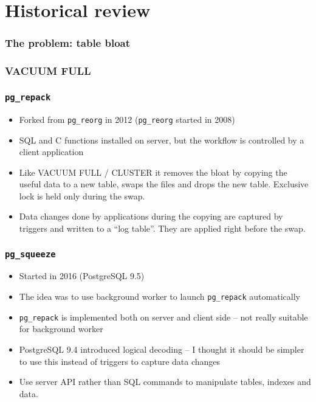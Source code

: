 \section{Historical review}

\begin{frame}
	\frametitle{The problem: table bloat}
\end{frame}

\begin{frame}
	\frametitle{VACUUM FULL}
\end{frame}

\begin{frame}
	\frametitle{\texttt{pg\_repack}}
  \begin{itemize}
    \item Forked from \texttt{pg\_reorg} in 2012 (\texttt{pg\_reorg} started
      in 2008)
    \item SQL and C functions installed on server, but the workflow is
      controlled by a client application
    \item Like VACUUM FULL / CLUSTER it removes the bloat by copying the
      useful data to a new table, swaps the files and drops the new
      table. Exclusive lock is held only during the swap.
    \item Data changes done by applications during the copying are captured by
      triggers and written to a ``log table''. They are applied right before
      the swap.
  \end{itemize}
\end{frame}

\begin{frame}
        \frametitle{\texttt{pg\_squeeze}}
  \begin{itemize}
    \item Started in 2016 (PostgreSQL 9.5)
    \item The idea was to use background worker to launch \texttt{pg\_repack} automatically
    \item \texttt{pg\_repack} is implemented both on server and client side --
      not really suitable for background worker
    \item PostgreSQL 9.4 introduced logical decoding -- I thought it should be
      simpler to use this instead of triggers to capture data changes
    \item Use server API rather than SQL commands to manipulate tables,
      indexes and data.
  \end{itemize}
\end{frame}

